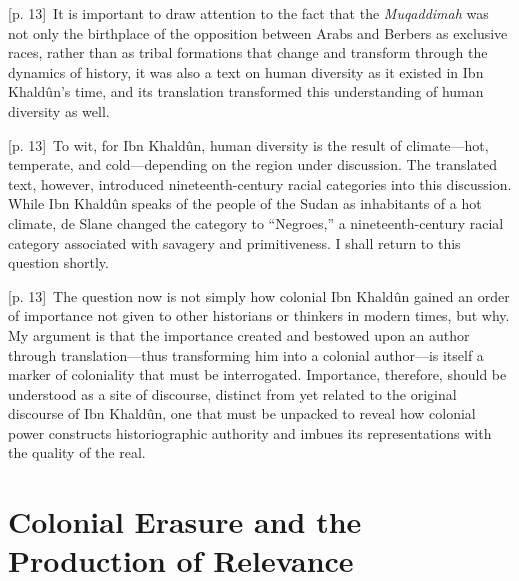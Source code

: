 \documentclass[10pt,a4paper]{article}
\begin{document}
{\scriptsize\color{gray} [p. 13]}\ It is important to draw attention to the fact that the \textit{Muqaddimah} was not only the birthplace of the opposition between Arabs and Berbers as exclusive races, rather than as tribal formations that change and transform through the dynamics of history, it was also a text on human diversity as it existed in Ibn Khaldûn’s time, and its translation transformed this understanding of human diversity as well.\par
{\scriptsize\color{gray} [p. 13]}\ To wit, for Ibn Khaldûn, human diversity is the result of climate—hot, temperate, and cold—depending on the region under discussion. The translated text, however, introduced nineteenth-century racial categories into this discussion. While Ibn Khaldûn speaks of the people of the Sudan as inhabitants of a hot climate, de Slane changed the category to “Negroes,” a nineteenth-century racial category associated with savagery and primitiveness. I shall return to this question shortly.\par
{\scriptsize\color{gray} [p. 13]}\ The question now is not simply how colonial Ibn Khaldûn gained an order of importance not given to other historians or thinkers in modern times, but why. My argument is that the importance created and bestowed upon an author through translation—thus transforming him into a colonial author—is itself a marker of coloniality that must be interrogated. Importance, therefore, should be understood as a site of discourse, distinct from yet related to the original discourse of Ibn Khaldûn, one that must be unpacked to reveal how colonial power constructs historiographic authority and imbues its representations with the quality of the real.\par
{}\section*{Colonial Erasure and the Production of Relevance}
\end{document}
